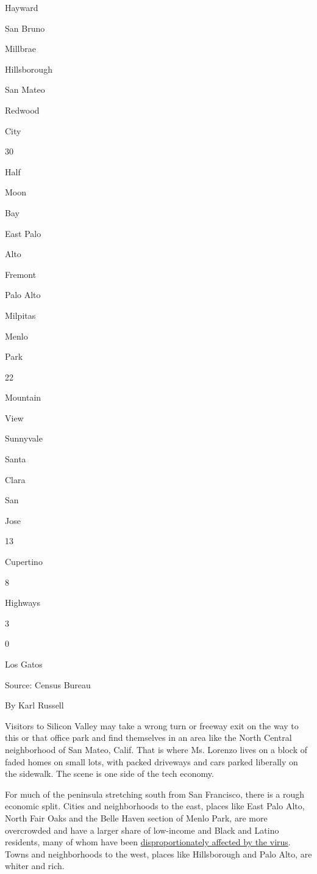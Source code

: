 Hayward

San Bruno

Millbrae

Hillsborough

San Mateo

Redwood

City

30

Half

Moon

Bay

East Palo

Alto

Fremont

Palo Alto

Milpitas

Menlo

Park

22

Mountain

View

Sunnyvale

Santa

Clara

San

Jose

13

Cupertino

8

Highways

3

0

Los Gatos

Source: Census Bureau

By Karl Russell

Visitors to Silicon Valley may take a wrong turn or freeway exit on the
way to this or that office park and find themselves in an area like the
North Central neighborhood of San Mateo, Calif. That is where Ms.
Lorenzo lives on a block of faded homes on small lots, with packed
driveways and cars parked liberally on the sidewalk. The scene is one
side of the tech economy.

For much of the peninsula stretching south from San Francisco, there is
a rough economic split. Cities and neighborhoods to the east, places
like East Palo Alto, North Fair Oaks and the Belle Haven section of
Menlo Park, are more overcrowded and have a larger share of low-income
and Black and Latino residents, many of whom have been
\href{https://www.nytimes.com/interactive/2020/07/05/us/coronavirus-latinos-african-americans-cdc-data.html}{disproportionately
affected by the virus}. Towns and neighborhoods to the west, places like
Hillsborough and Palo Alto, are whiter and rich.

